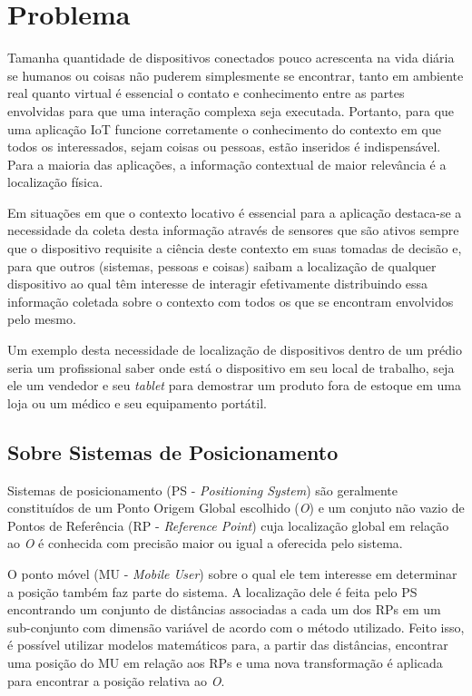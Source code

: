 \section{Problema}
\label{sec:Problema}

Tamanha quantidade de dispositivos conectados pouco acrescenta na vida diária se
humanos ou coisas não puderem simplesmente se encontrar, tanto em ambiente real
quanto virtual é essencial o contato e conhecimento entre as partes envolvidas
para que uma interação complexa seja executada. Portanto, para que uma aplicação
IoT funcione corretamente o conhecimento do contexto em que todos os
interessados, sejam coisas ou pessoas, estão inseridos é indispensável. Para a
maioria das aplicações, a informação contextual de maior relevância é a
localização física.

Em situações em que o contexto locativo é essencial para a aplicação destaca-se
a necessidade da coleta desta informação através de sensores que são ativos
sempre que o dispositivo requisite a ciência deste contexto em suas tomadas de
decisão e, para que outros (sistemas, pessoas e coisas) saibam a localização de
qualquer dispositivo ao qual têm interesse de interagir efetivamente
distribuindo essa informação coletada sobre o contexto com todos os que se
encontram envolvidos pelo mesmo.

Um exemplo desta necessidade de localização de dispositivos dentro de um prédio
seria um profissional saber onde está o dispositivo em seu local de trabalho,
seja ele um vendedor e seu \emph{tablet} para demostrar um produto fora de
estoque em uma loja ou um médico e seu equipamento portátil.

\subsection{Sobre Sistemas de Posicionamento}
\label{subsec:Sobre Sistemas de Posicionamento}

Sistemas de posicionamento (PS - \emph{Positioning System}) são geralmente
constituídos de um Ponto Origem Global escolhido (\emph{O}) e um conjuto não
vazio de Pontos de Referência (RP - \emph{Reference Point}) cuja localização
global em relação ao \emph{O} é conhecida com precisão maior ou igual a
oferecida pelo sistema.

O ponto móvel (MU - \emph{Mobile User}) sobre o qual ele tem interesse em
determinar a posição também faz parte do sistema. A localização dele é feita
pelo PS encontrando um conjunto de distâncias associadas a cada um dos RPs em um
sub-conjunto com dimensão variável de acordo com o método utilizado. Feito isso, é
possível utilizar modelos matemáticos para, a partir das distâncias, encontrar
uma posição do MU em relação aos RPs e uma nova transformação é aplicada para
encontrar a posição relativa ao \emph{O}.

